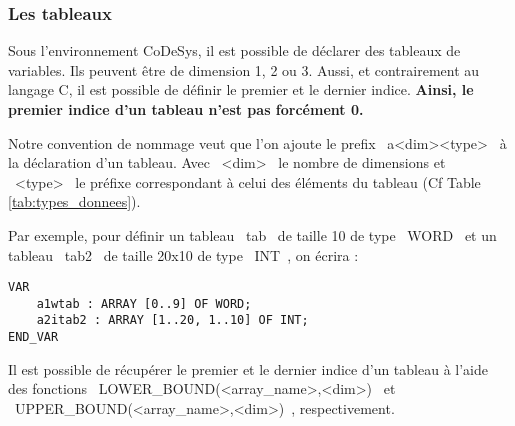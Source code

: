 \subsubsection{Les tableaux}
Sous l'environnement CoDeSys, il est possible de déclarer des tableaux de variables. Ils peuvent être de dimension 1, 2 ou 3. Aussi, et contrairement au langage C, il est possible de définir le premier et le dernier indice. \textbf{Ainsi, le premier indice d'un tableau n'est pas forcément 0.} 


Notre convention de nommage veut que l'on ajoute le prefix ~a<dim><type>~ à la déclaration d'un tableau. Avec ~<dim>~ le nombre de dimensions et ~<type>~ le préfixe correspondant à celui des éléments du tableau (Cf Table \ref{tab:types_donnees}).

Par exemple, pour définir un tableau ~tab~ de taille 10 de type ~WORD~ et un tableau ~tab2~ de taille 20x10 de type ~INT~, on écrira :
\begin{lstlisting}[language=ST]
VAR 
    a1wtab : ARRAY [0..9] OF WORD;
    a2itab2 : ARRAY [1..20, 1..10] OF INT;
END_VAR
\end{lstlisting}

Il est possible de récupérer le premier et le dernier indice d'un tableau à l'aide des fonctions ~LOWER_BOUND(<array_name>,<dim>)~ et ~UPPER_BOUND(<array_name>,<dim>)~, respectivement.


